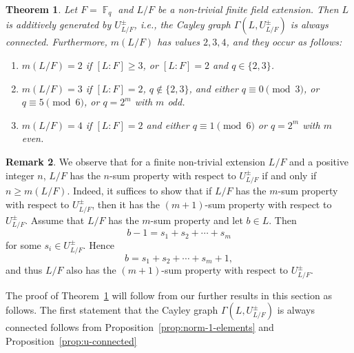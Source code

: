\documentclass[11pt, a4paper]{amsart}
\newtheorem{thm}{Theorem}[section]
\theoremstyle{definition}
\newtheorem{rem}[thm]{Remark}
\DeclareMathOperator{\F}{\mathbb{F}}
\numberwithin{equation}{section}
\begin{document}
\begin{thm} \label{thm:normalized-units-fields}
 Let $F=\F_q$ and $L/F$ be a non-trivial finite field extension. %
 Then $L$ is additively generated by $U_{L/F}^{\pm}$, i.e., the Cayley graph $\Gamma(L, U_{L/F}^{\pm})$ is always connected. 
 Furthermore, $m(L/F)$ has values $2,3,4$, and they occur as follows:
 \begin{enumerate}
\item $m(L/F)=2$ if $[L:F]\geq 3$, or $[L:F]=2$ and $q\in \{2,3\}$.
\item $m(L/F)=3$ if $[L:F]=2$, $q\not\in\{ 2,3\}$, and either \( q\equiv 0 \pmod 3\), or \(q\equiv 5 \pmod 6\),
or \(q=2^m\) with $m$  odd.
 \item $m(L/F)=4$ if $[L:F]=2$ and either \( q\equiv 1 \pmod 6\) or  \(q=2^m\)  with  $m$  even.
\end{enumerate}
\end{thm}
\begin{rem} \label{rem:n-sum-upper}
We observe that for a finite non-trivial extension $L/F$ and a positive integer $n$,  $L/F$ has the
$n$-sum property with respect to $U_{L/F}^{\pm}$ if and only if \( n\geq m(L/F).\) 
Indeed, it suffices to show that if $L/F$ has the $m$-sum property with
respect to $U_{L/F}^{\pm}$, then it has the $(m+1)$-sum property with
respect to $U_{L/F}^{\pm}$. Assume that $L/F$ has the $m$-sum property and
let $b\in L$. Then
\[
b-1=s_1+s_2+\cdots+s_m
\]
for some $s_i\in U_{L/F}^{\pm}$. Hence
\[
b=s_1+s_2+\cdots+s_m+1,
\]
and thus $L/F$ also has the $(m+1)$-sum property with respect to
$U_{L/F}^{\pm}$.
\end{rem}
The proof of Theorem~\ref{thm:normalized-units-fields} will follow from our further results in this
section as follows. The first statement that the Cayley graph $\Gamma(L, U_{L/F}^{\pm})$ is always connected follows  from Proposition~\ref{prop:norm-1-elements} and Proposition~\ref{prop:u-connected}
\end{document}
